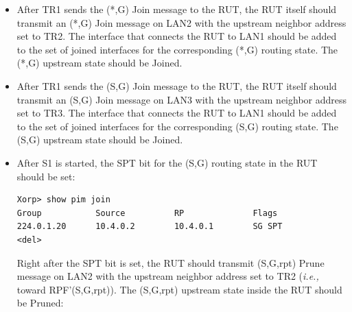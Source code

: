 \documentclass[11pt]{report}
\newcommand{\ie}{\emph{i.e.,}\xspace}
\begin{document}
\begin{itemize}

  \item After TR1 sends the (*,G) Join message to the RUT, the RUT itself
  should transmit an (*,G) Join message on LAN2 with the upstream neighbor
  address set to TR2. The interface that connects the RUT to LAN1 should be
  added to the set of joined interfaces for the corresponding (*,G) routing
  state. The (*,G) upstream state should be Joined.

  \item After TR1 sends the (S,G) Join message to the RUT, the RUT itself
  should transmit an (S,G) Join message on LAN3 with the upstream neighbor
  address set to TR3. The interface that connects the RUT to LAN1 should be
  added to the set of joined interfaces for the corresponding (S,G) routing
  state. The (S,G) upstream state should be Joined.

  \item After S1 is started, the SPT bit for the (S,G) routing state in the
  RUT should be set:
\begin{verbatim}
Xorp> show pim join 
Group           Source          RP              Flags
224.0.1.20      10.4.0.2        10.4.0.1        SG SPT 
<del>
\end{verbatim}

  Right after the SPT bit is set, the RUT should transmit (S,G,rpt) Prune
  message on LAN2 with the upstream neighbor address set to TR2 (\ie toward
  RPF'(S,G,rpt)). The (S,G,rpt) upstream state inside the RUT should be
  Pruned:


\end{itemize}
\end{document}
